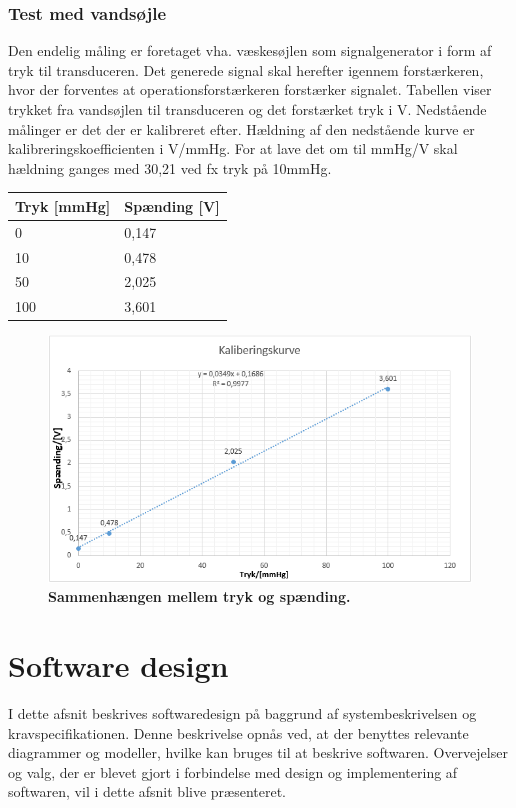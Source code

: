 \subsubsection{Test med vandsøjle}
Den endelig måling er foretaget vha. væskesøjlen som signalgenerator i form af tryk til transduceren. Det generede signal skal herefter igennem forstærkeren, hvor der forventes at operationsforstærkeren forstærker signalet. Tabellen viser trykket fra vandsøjlen til transduceren og det forstærket tryk i V. Nedstående målinger er det der er kalibreret efter. Hældning af den nedstående kurve er kalibreringskoefficienten i V/mmHg. For at lave det om til mmHg/V skal hældning ganges med 30,21 ved fx tryk på 10mmHg. 
\begin{table}[H]
\label{tab:tabel2}
\begin{tabular}{| l | l |}
   \hline
   Tryk [mmHg] & Spænding [V] \\ \hline
   0 & 0,147 \\ \hline
   10 & 0,478\\ \hline
   50 & 2,025 \\ \hline
   100 & 3,601\\\hline
\end{tabular}
\end{table}
\begin{figure}[H]
\includegraphics[width =1.0\textwidth , center]{billeder/vandsojleTest}
\caption{\textbf{Sammenhængen mellem tryk og spænding.}}
\end{figure}
\newpage
\section{Software design}
I dette afsnit beskrives softwaredesign på baggrund af systembeskrivelsen og kravspecifikationen. Denne beskrivelse opnås ved, at der benyttes relevante diagrammer og modeller, hvilke kan bruges til at beskrive softwaren. Overvejelser og valg, der er blevet gjort i forbindelse med design og implementering af softwaren, vil i dette afsnit blive præsenteret.

